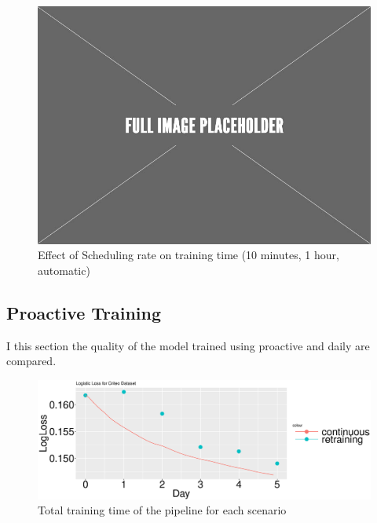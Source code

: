 \begin{figure}[h!]
\centering
\includegraphics[width=\columnwidth]{../images/placeholder.jpeg}
\caption{Effect of Scheduling rate on training time (10 minutes, 1 hour, automatic)}
\label{fig:scheduling-policy-time}
\vspace{2mm}
\end{figure}


\subsection{Proactive Training}
I this section the quality of the model trained using proactive and daily are compared.
\begin{figure}[h!]
\centering
\includegraphics[width=\columnwidth]{../images/experiment-results/criteo-log-loss-continuous-vs-daily.eps}
\caption{Total training time of the pipeline for each scenario}
\label{fig:loss-proactive-vs-daily}
\vspace{2mm}
\end{figure}


